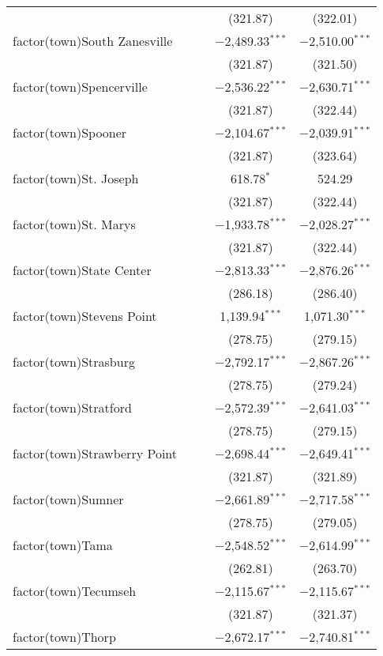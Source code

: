 \begin{table}[!htbp]
\begin{tabular}{@{\extracolsep{5pt}}lcccc}
  &  &  & (321.87) & (322.01) \\ 
  factor(town)South Zanesville &  &  & $-$2,489.33$^{***}$ & $-$2,510.00$^{***}$ \\ 
  &  &  & (321.87) & (321.50) \\ 
  factor(town)Spencerville &  &  & $-$2,536.22$^{***}$ & $-$2,630.71$^{***}$ \\ 
  &  &  & (321.87) & (322.44) \\ 
  factor(town)Spooner &  &  & $-$2,104.67$^{***}$ & $-$2,039.91$^{***}$ \\ 
  &  &  & (321.87) & (323.64) \\ 
  factor(town)St. Joseph &  &  & 618.78$^{*}$ & 524.29 \\ 
  &  &  & (321.87) & (322.44) \\ 
  factor(town)St. Marys &  &  & $-$1,933.78$^{***}$ & $-$2,028.27$^{***}$ \\ 
  &  &  & (321.87) & (322.44) \\ 
  factor(town)State Center &  &  & $-$2,813.33$^{***}$ & $-$2,876.26$^{***}$ \\ 
  &  &  & (286.18) & (286.40) \\ 
  factor(town)Stevens Point &  &  & 1,139.94$^{***}$ & 1,071.30$^{***}$ \\ 
  &  &  & (278.75) & (279.15) \\ 
  factor(town)Strasburg &  &  & $-$2,792.17$^{***}$ & $-$2,867.26$^{***}$ \\ 
  &  &  & (278.75) & (279.24) \\ 
  factor(town)Stratford &  &  & $-$2,572.39$^{***}$ & $-$2,641.03$^{***}$ \\ 
  &  &  & (278.75) & (279.15) \\ 
  factor(town)Strawberry Point &  &  & $-$2,698.44$^{***}$ & $-$2,649.41$^{***}$ \\ 
  &  &  & (321.87) & (321.89) \\ 
  factor(town)Sumner &  &  & $-$2,661.89$^{***}$ & $-$2,717.58$^{***}$ \\ 
  &  &  & (278.75) & (279.05) \\ 
  factor(town)Tama &  &  & $-$2,548.52$^{***}$ & $-$2,614.99$^{***}$ \\ 
  &  &  & (262.81) & (263.70) \\ 
  factor(town)Tecumseh &  &  & $-$2,115.67$^{***}$ & $-$2,115.67$^{***}$ \\ 
  &  &  & (321.87) & (321.37) \\ 
  factor(town)Thorp &  &  & $-$2,672.17$^{***}$ & $-$2,740.81$^{***}$ \\ 

\end{tabular}
\end{table}
